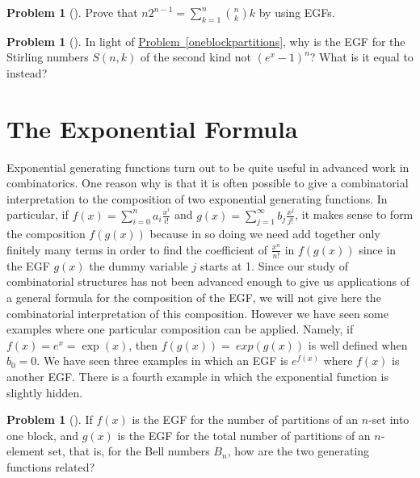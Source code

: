 \documentclass[10pt,]{book}
\theoremstyle{plain}
\theoremstyle{definition}
\newtheorem{activity}[project]{Problem}
\theoremstyle{definition}
\numberwithin{equation}{chapter}
\newcommand{\importantarrow}{\Rightarrow}
\begin{document}
\begin{activity}[]\marginsymbol[-1em]{\pdftooltip{$\importantarrow$}{especially interesting}} \label{activity-407}
Prove that \(n2^{n-1} = \sum_{k=1}^n \binom{n}{k}k\) by using EGFs.%
\end{activity}
\begin{activity}[] \label{activity-408}
In light of \hyperref[oneblockpartitions]{Problem~\ref{oneblockpartitions}}, why is the EGF for the Stirling numbers \(S(n,k)\) of the second kind not \((e^x -1)^n\)? What is it equal to instead?%
\end{activity}
\typeout{************************************************}
\typeout{************************************************}
\section[{The Exponential Formula}]{The Exponential Formula}\label{app3-5-expformula}
Exponential generating functions turn out to be quite useful in advanced work in combinatorics. One reason why is that it is often possible to give a combinatorial interpretation to the composition of two exponential generating functions. In particular, if \(f(x) =
\sum_{i=0}^n a_i\frac{x^i}{i!}\) and \(g(x) = \sum_{j=1}^\infty b_j \frac{x^j}{j!}\), it makes sense to form the composition \(f(g(x))\) because in so doing we need add together only finitely many terms in order to find the coefficient of \(\frac{x^n}{n!}\) in \(f(g(x))\) since in the EGF \(g(x)\) the dummy variable \(j\) starts at 1. Since our study of combinatorial structures has not been advanced enough to give us applications of a general formula for the composition of the EGF, we will not give here the combinatorial interpretation of this composition. However we have seen some examples where one particular composition can be applied. Namely, if \(f(x) = e^x = \exp(x)\), then \(f(g(x)) =\ exp(g(x))\) is well defined when \(b_0=0\). We have seen three examples in which an EGF is \(e^{f(x)}\) where \(f(x)\) is another EGF. There is a fourth example in which the exponential function is slightly hidden.%
\begin{activity}[] \label{exp_oneblock_}
If \(f(x)\) is the EGF for the number of partitions of an \(n\)-set into one block, and \(g(x)\) is the EGF for the total number of partitions of an \(n\)-element set, that is, for the Bell numbers \(B_n\), how are the two generating functions related?%
\end{activity}
\end{document}
